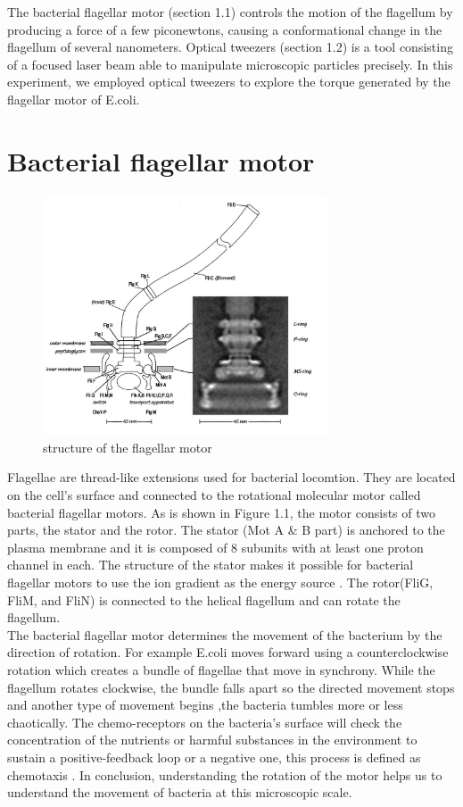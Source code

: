 \documentclass[a4paper,english,12pt,bibliography=totoc]{scrreprt}
\begin{document}
The bacterial flagellar motor (section 1.1) controls the motion of the flagellum by producing a force of a few piconewtons, causing a conformational change in the flagellum of several nanometers. Optical tweezers (section 1.2) is a tool consisting of a focused laser beam able to manipulate microscopic particles precisely. In this experiment, we employed optical tweezers to explore the torque generated by the flagellar motor of E.coli.


\section{Bacterial flagellar motor}

\begin{figure}[H]
    \centering
    \includegraphics[width = 0.75\textwidth]{Images/flagellar motor.png}
    \caption{structure of the flagellar motor\cite{lab_manual}}
\end{figure}

Flagellae are thread-like extensions used for bacterial locomtion. They are located on the cell's surface and connected to the rotational molecular motor called bacterial flagellar motors. As is shown in Figure 1.1, the motor consists of two parts, the stator and the rotor. The stator (Mot A \& B part) is anchored to the plasma membrane and it is composed of 8 subunits with at least one proton channel in each. The structure of the stator makes it possible for bacterial flagellar motors to use the   ion gradient as the energy source \cite{fung_powering_1995}. The rotor(FliG, FliM, and FliN) is connected to the helical flagellum and can rotate the flagellum.\\

The bacterial flagellar motor determines the movement of the bacterium by the direction of rotation. For example E.coli moves forward using a counterclockwise rotation which creates a bundle of flagellae that move in synchrony. While the flagellum rotates clockwise, the bundle falls apart so the directed movement stops and another type of movement begins ,the bacteria tumbles more or less chaotically. The chemo-receptors on the bacteria's surface will check the concentration of the nutrients or harmful substances in the environment to sustain a positive-feedback loop or a negative one, this process is defined as chemotaxis . In conclusion, understanding the rotation of the motor helps us to understand the movement of bacteria at this microscopic scale.
\end{document}

